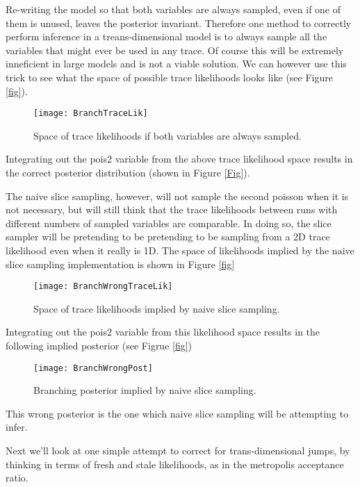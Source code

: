 Re-writing the model so that both variables are always sampled, even if one of them is unused, leaves the posterior invariant. Therefore one method to correctly perform inference in a treans-dimensional model is to always sample all the variables that might ever be used in any trace. Of course this will be extremely inneficient in large models and is not a viable solution. We can however use this trick to see what the space of possible trace likelihoods looks like (see Figure \ref{fig}).

\begin{figure}[H]
    \centering
    \texttt{[image: BranchTraceLik]}
    \caption{Space of trace likelihoods if both variables are always sampled.}
    \label{fig:BranchTraceLik}
\end{figure}

Integrating out the pois2 variable from the above trace likelihood space results in the correct posterior distribution (shown in Figure \ref{Fig}).

The naive slice sampling, however, will not sample the second poisson when it is not necessary, but will still think that the trace likelihoods between runs with different numbers of sampled variables are comparable. In doing so, the slice sampler will be pretending to be pretending to be sampling from a 2D trace likelihood even when it really is 1D. The space of likelihoods implied by the naive slice sampling implementation is shown in Figure \ref{fig}

\begin{figure}[H]
    \centering
    \texttt{[image: BranchWrongTraceLik]}
    \caption{Space of trace likelihoods implied by naive slice sampling.}
    \label{fig:BranchWrongTraceLik}
\end{figure}

Integrating out the pois2 variable from this likelihood space results in the following implied posterior (see Figrue \ref{fig})

\begin{figure}[H]
    \centering
    \texttt{[image: BranchWrongPost]}
    \caption{Branching posterior implied by naive slice sampling.}
    \label{fig:BranchWrongPost}
\end{figure}

This wrong posterior is the one which naive slice sampling will be attempting to infer. 

Next we'll look at one simple attempt to correct for trans-dimensional jumps, by thinking in terms of fresh and stale likelihoods, as in the metropolis acceptance ratio.

